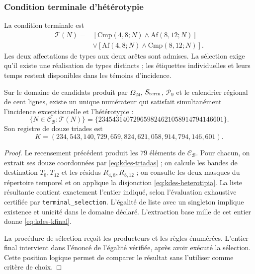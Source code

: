\subsubsection{Condition terminale d'hétérotypie}

La condition terminale est
\begin{equation}
 \begin{split}
 \mathcal T(N)={}&
 [\mathrm{Cmp}(4,8;N)\wedge\mathrm{Af}(8,12;N)]\\
 &\vee[\mathrm{Af}(4,8;N)\wedge\mathrm{Cmp}(8,12;N)].
 \end{split}
 \label{eq:kdes-heterotipia}
\end{equation}
Les deux affectations de types aux deux arêtes sont admises. La
sélection exige qu'il existe une réalisation de types distincts ; les
étiquettes individuelles et leurs temps restent disponibles dans les
témoins d'incidence.

\begin{theorem}
Sur le domaine de candidats produit par
$\Omega_{24}$, $\mathcal S_{\rm term}$, $\mathcal P_9$ et le calendrier
régional de cent lignes, existe un unique numérateur qui satisfait
simultanément l'incidence exceptionnelle et l'hétérotypie :
\[
 \{N\in\mathcal C_{\mathcal B}:\mathcal T(N)\}
 =\{234543140729659824621058914794146601\}.
\]
Son registre de douze triades est
\begin{equation}
 K=(234,543,140,729,659,824,621,058,914,794,146,601).
 \label{eq:kdes-kfinal}
\end{equation}
\end{theorem}
\begin{proof}
Le recensement précédent produit les $79$ éléments de
$\mathcal C_{\mathcal B}$. Pour chacun, on extrait ses douze
coordonnées par \eqref{eq:kdes-triadas} ; on calcule les bandes de
destination $T_8,T_{12}$ et les résidus $R_{4,8},R_{8,12}$ ; on consulte
les deux masques du répertoire temporel et on applique la disjonction
\eqref{eq:kdes-heterotipia}. La liste résultante contient exactement
l'entier indiqué, selon l'évaluation exhaustive certifiée par
\texttt{terminal\_selection}. L'égalité de liste avec un singleton
implique existence et unicité dans le domaine déclaré. L'extraction
base mille de cet entier donne \eqref{eq:kdes-kfinal}.

La procédure de sélection reçoit les producteurs et les règles énumérées. L'entier final intervient dans l'énoncé de l'égalité vérifiée, après avoir exécuté la sélection. Cette position logique permet de comparer le résultat sans l'utiliser comme critère de choix.
\end{proof}

